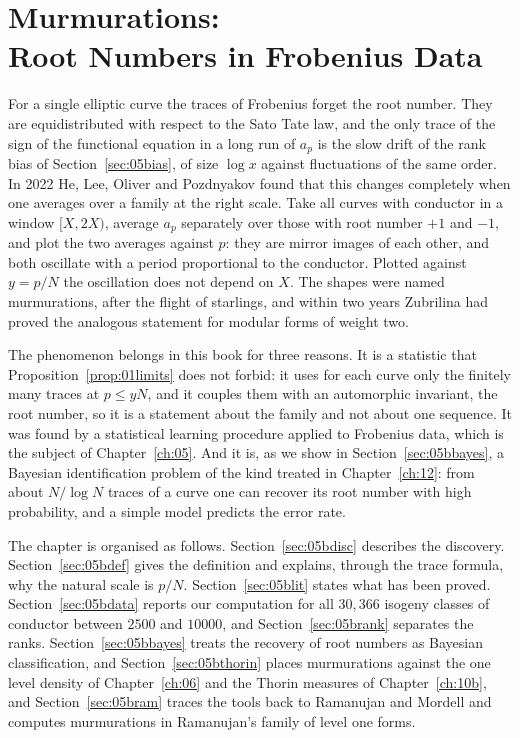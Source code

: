 \chapter[Murmurations: Root Numbers in Frobenius Data]{Murmurations:\\ Root Numbers in Frobenius Data}\label{ch:05b}

For a single elliptic curve the traces of Frobenius forget the root number. They are equidistributed with respect to the Sato Tate law, and the only trace of the sign of the functional equation in a long run of $a_p$ is the slow drift of the rank bias of Section~\ref{sec:05bias}, of size $\log x$ against fluctuations of the same order. In 2022 He, Lee, Oliver and Pozdnyakov \cite{hlop2022} found that this changes completely when one averages over a family at the right scale. Take all curves with conductor in a window $[X,2X)$, average $a_p$ separately over those with root number $+1$ and $-1$, and plot the two averages against $p$: they are mirror images of each other, and both oscillate with a period proportional to the conductor. Plotted against $y=p/N$ the oscillation does not depend on $X$. The shapes were named murmurations, after the flight of starlings, and within two years Zubrilina \cite{zubrilina2023} had proved the analogous statement for modular forms of weight two.

The phenomenon belongs in this book for three reasons. It is a statistic that Proposition~\ref{prop:01limits} does not forbid: it uses for each curve only the finitely many traces at $p\le yN$, and it couples them with an automorphic invariant, the root number, so it is a statement about the family and not about one sequence. It was found by a statistical learning procedure applied to Frobenius data, which is the subject of Chapter~\ref{ch:05}. And it is, as we show in Section~\ref{sec:05bbayes}, a Bayesian identification problem of the kind treated in Chapter~\ref{ch:12}: from about $N/\log N$ traces of a curve one can recover its root number with high probability, and a simple model predicts the error rate.

The chapter is organised as follows. Section~\ref{sec:05bdisc} describes the discovery. Section~\ref{sec:05bdef} gives the definition and explains, through the trace formula, why the natural scale is $p/N$. Section~\ref{sec:05blit} states what has been proved. Section~\ref{sec:05bdata} reports our computation for all $30{,}366$ isogeny classes of conductor between $2500$ and $10000$, and Section~\ref{sec:05brank} separates the ranks. Section~\ref{sec:05bbayes} treats the recovery of root numbers as Bayesian classification, and Section~\ref{sec:05bthorin} places murmurations against the one level density of Chapter~\ref{ch:06} and the Thorin measures of Chapter~\ref{ch:10b}, and Section~\ref{sec:05bram} traces the tools back to Ramanujan and Mordell and computes murmurations in Ramanujan's family of level one forms.

